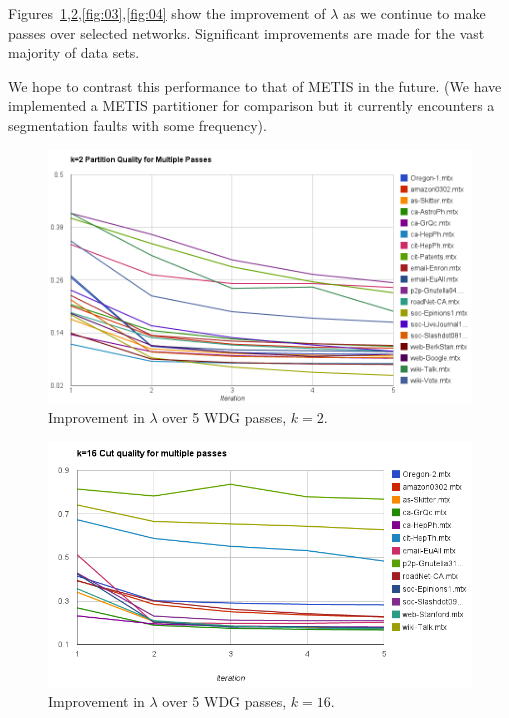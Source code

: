 \documentclass[11pt]{article}
\begin{document}
Figures~\ref{fig:01},\ref{fig:02},\ref{fig:03},\ref{fig:04} show the improvement of $\lambda$ as we continue to make passes over selected networks. Significant improvements are made for the vast majority of data sets.

We hope to contrast this performance to that of METIS in the future. (We have implemented a METIS partitioner for comparison but it currently encounters a segmentation faults with some frequency). 


\begin{figure}[h!]
\centering
\includegraphics[scale=0.55] {figures/2partlambda}
\caption[Caption for]{Improvement in $\lambda$ over 5 WDG passes, $k=2$.}
\label{fig:01}
\end{figure}

\begin{figure}[h!]
\centering
\includegraphics[scale=0.65] {figures/16partlambda}
\caption[Caption for]{Improvement in $\lambda$ over 5 WDG passes, $k=16$.}
\label{fig:02}
\end{figure}
\end{document}
